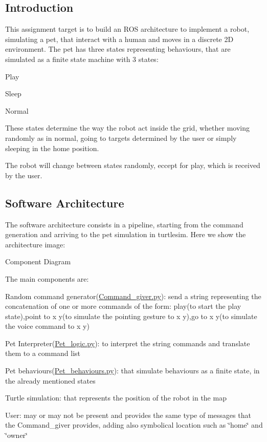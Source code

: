 \subsection*{Introduction}

This assignment target is to build an R\+OS architecture to implement a robot, simulating a pet, that interact with a human and moves in a discrete 2D environment. The pet has three states representing behaviours, that are simulated as a finite state machine with 3 states\+:
\begin{DoxyItemize}
\item Play
\item Sleep
\item Normal
\end{DoxyItemize}

These states determine the way the robot act inside the grid, whether moving randomly as in normal, going to targets determined by the user or simply sleeping in the home position.

The robot will change between states randomly, eccept for play, which is received by the user.

\subsection*{Software Architecture}

The software architecture consists in a pipeline, starting from the command generation and arriving to the pet simulation in turtlesim. Here we show the architecture image\+:

 \begin{center}Component Diagram\end{center} 

The main components are\+:
\begin{DoxyItemize}
\item Random command generator(\hyperlink{Command__giver_8py}{Command\+\_\+giver.\+py})\+: send a string representing the concatenation of one or more commands of the form\+: \textquotesingle{}play\textquotesingle{}(to start the play state),\textquotesingle{}point to x y\textquotesingle{}(to simulate the pointing gesture to x y),\textquotesingle{}go to x y\textquotesingle{}(to simulate the voice command to x y)
\item Pet Interpreter(\hyperlink{Pet__logic_8py}{Pet\+\_\+logic.\+py})\+: to interpret the string commands and translate them to a command list
\item Pet behaviours(\hyperlink{Pet__behaviours_8py}{Pet\+\_\+behaviours.\+py})\+: that simulate behaviours as a finite state, in the already mentioned states
\item Turtle simulation\+: that represents the position of the robot in the map
\item User\+: may or may not be present and provides the same type of messages that the Command\+\_\+giver provides, adding also symbolical location such as \char`\"{}home\char`\"{} and \char`\"{}owner\char`\"{}
\end{DoxyItemize}

